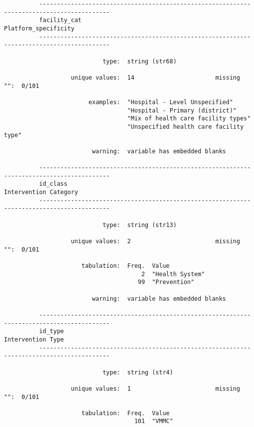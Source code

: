 \documentclass{article}
\begin{document}
\begin{verbatim}
          ------------------------------------------------------------------------------------------
          facility_cat                                                          Platform_specificity
          ------------------------------------------------------------------------------------------
          
                            type:  string (str68)
          
                   unique values:  14                       missing "":  0/101
          
                        examples:  "Hospital - Level Unspecified"
                                   "Hospital - Primary (district)"
                                   "Mix of health care facility types"
                                   "Unspecified health care facility type"
          
                         warning:  variable has embedded blanks
          
          ------------------------------------------------------------------------------------------
          id_class                                                             Intervention Category
          ------------------------------------------------------------------------------------------
          
                            type:  string (str13)
          
                   unique values:  2                        missing "":  0/101
          
                      tabulation:  Freq.  Value
                                       2  "Health System"
                                      99  "Prevention"
          
                         warning:  variable has embedded blanks
          
          ------------------------------------------------------------------------------------------
          id_type                                                                  Intervention Type
          ------------------------------------------------------------------------------------------
          
                            type:  string (str4)
          
                   unique values:  1                        missing "":  0/101
          
                      tabulation:  Freq.  Value
                                     101  "VMMC"
          

\end{verbatim}
\end{document}
